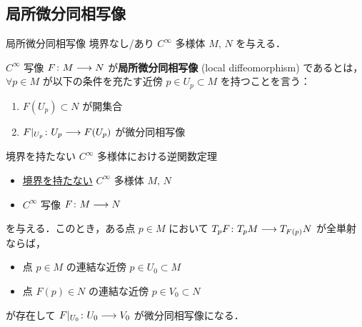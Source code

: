 \documentclass[TQFT_main]{subfiles}
\begin{document}
\subsection{局所微分同相写像}

\begin{mydef}[label=def:loc-diffeo]{局所微分同相写像}
    境界なし/あり $C^\infty$ 多様体 $M,\, N$ を与える．
    
    $C^\infty$ 写像 $F \colon M \longrightarrow N$ が\textbf{局所微分同相写像} (local diffeomorphism) であるとは，
    $\forall p \in M$ が以下の条件を充たす近傍 $p \in U_p \subset M$ を持つことを言う：
    \begin{enumerate}
        \item $F(U_p) \subset N$ が開集合
        \item $F|_{U_p} \colon U_p \longrightarrow F(U_p)$ が微分同相写像
    \end{enumerate}
\end{mydef}

\begin{mytheo}[label=thm:inverse-function]{境界を持たない $C^\infty$ 多様体における逆関数定理}
    \begin{itemize}
        \item \underline{境界を持たない} $C^\infty$ 多様体 $M,\, N$
        \item $C^\infty$ 写像 $F \colon M \longrightarrow N$
    \end{itemize}
    を与える．このとき，ある点 $p \in M$ において $T_p F \colon T_p M \longrightarrow T_{F(p)} N$ が全単射ならば，
    \begin{itemize}
        \item 点 $p \in M$ の連結な近傍 $p \in U_0 \subset M$
        \item 点 $F(p) \in N$ の連結な近傍 $p \in V_0 \subset N$
    \end{itemize}
    が存在して $F|_{U_0} \colon U_0 \longrightarrow V_0$ が微分同相写像になる．
\end{mytheo}
\end{document}
